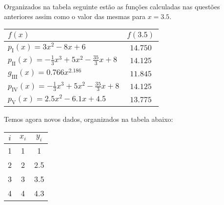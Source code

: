 \documentclass{homework}
\begin{document}
	\quest%
	
	Organizados na tabela seguinte estão as funções calculadas nas questões anteriores assim como o valor das mesmas para $x = 3.5$.
	
	\begin{fig}
		\begin{tabular}{|l|c|}
			\hline
			$f(x)$ & $f(3.5)$\\
			\hline
			$p_\text{I}(x) = 3 x^2 - 8 x + 6$ & $14.750$ \\
			$p_\text{II}(x) = -\frac{1}{3} x^3 + 5 x^2 -\frac{35}{3} x + 8$ & $14.125$ \\
			$g_\text{III}(x) = 0.766 x^{2.186}$ & $11.845$ \\
			$p_\text{IV}(x) = -\frac{1}{3} x^3 + 5 x^2  -\frac{35}{3} x + 8$ & $14.125$\\
			$p_\text{V}(x) = 2.5 x^2 - 6.1 x + 4.5$ & $13.775$\\
			\hline
		\end{tabular}
	\end{fig}

	\quest%
	
	Temos agora novos dados, organizados na tabela abaixo:
	
	\begin{fig}
		\begin{tabular}{|c|c|c|}
			\hline
			$i$ & $x_i$ & $y_i$\\
			\hline
			1 & 1 & 1\\
			2 & 2 & 2.5\\
			3 & 3 & 3.5\\
			4 & 4 & 4.3\\
			\hline
		\end{tabular}
	\end{fig}
	
\end{document}

